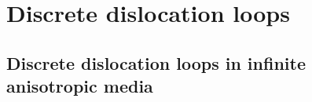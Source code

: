 




\section{Discrete dislocation loops\label{disloC_classical}}
 
\subsection{Discrete dislocation loops in infinite anisotropic media}
 
